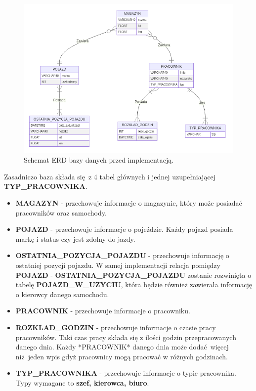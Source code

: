 \documentclass{article}
\begin{document}
\begin{figure}[H]
    \centering
    \includegraphics[width=\textwidth]{assets/chart.png}
    \caption{Schemat ERD bazy danych przed implementacją.}
\end{figure}

Zasadniczo baza składa się z 4 tabel głównych i jednej uzupełniającej \textbf{TYP\_PRACOWNIKA}. 

\begin{itemize}
    \item \textbf{MAGAZYN} - przechowuje informacje o magazynie, który może posiadać
        pracowników oraz samochody. 
    \item \textbf{POJAZD} - przechowuje informacje o pojeździe. Każdy pojazd posiada
        markę i status czy jest zdolny do jazdy.
    \item \textbf{OSTATNIA\_POZYCJA\_POJAZDU} - przechowuje informację o ostatniej pozycji pojazdu. W samej implementacji relacja pomiędzy \textbf{POJAZD} - \textbf{OSTATNIA\_POZYCJA\_POJAZDU} zostanie rozwinięta o tabelę \textbf{POJAZD\_W\_UZYCIU}, która będzie również zawierała informację o kierowcy danego samochodu.
    \item \textbf{PRACOWNIK} - przechowuje informacje o pracowniku.
    \item \textbf{ROZKLAD\_GODZIN} - przechowuje informacje o czasie pracy pracowników.
        Taki czas pracy składa się z ilości godzin przepracowanych danego dnia.
        Każdy *PRACOWNIK* danego dnia może dodać więcej niż jeden wpis gdyż
        pracownicy mogą pracować w różnych godzinach.
    \item \textbf{TYP\_PRACOWNIKA} - przechowuje informacje o typie pracownika. Typy wymagane to \textbf{szef, kierowca, biuro}.
\end{itemize}
\end{document}
